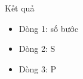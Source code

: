 Kết quả
\begin{itemize}
	\item     Dòng 1: số bước   
	\item     Dòng 2: S   
	\item     Dòng 3: P   
\end{itemize}